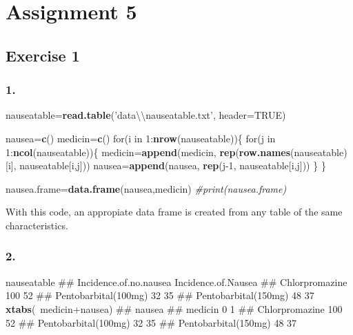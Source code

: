 \documentclass[11pt,]{article}
\newenvironment{Shaded}{\begin{snugshade}}{\end{snugshade}}
\newcommand{\KeywordTok}[1]{\textcolor[rgb]{0.13,0.29,0.53}{\textbf{{#1}}}}
\newcommand{\DataTypeTok}[1]{\textcolor[rgb]{0.13,0.29,0.53}{{#1}}}
\newcommand{\DecValTok}[1]{\textcolor[rgb]{0.00,0.00,0.81}{{#1}}}
\newcommand{\CharTok}[1]{\textcolor[rgb]{0.31,0.60,0.02}{{#1}}}
\newcommand{\StringTok}[1]{\textcolor[rgb]{0.31,0.60,0.02}{{#1}}}
\newcommand{\CommentTok}[1]{\textcolor[rgb]{0.56,0.35,0.01}{\textit{{#1}}}}
\newcommand{\OtherTok}[1]{\textcolor[rgb]{0.56,0.35,0.01}{{#1}}}
\newcommand{\NormalTok}[1]{{#1}}
\begin{document}
\section{Assignment 5}\label{assignment-5}

\subsection{Exercise 1}\label{exercise-1-1}

\subsubsection{1.}\label{section-20}

\begin{Shaded}
\begin{Highlighting}[]
\NormalTok{nauseatable=}\KeywordTok{read.table}\NormalTok{(}\StringTok{'data}\CharTok{\textbackslash{}\textbackslash{}}\StringTok{nauseatable.txt'}\NormalTok{, }\DataTypeTok{header=}\OtherTok{TRUE}\NormalTok{)}

\NormalTok{nausea=}\KeywordTok{c}\NormalTok{()}
\NormalTok{medicin=}\KeywordTok{c}\NormalTok{()}
\NormalTok{for(i in }\DecValTok{1}\NormalTok{:}\KeywordTok{nrow}\NormalTok{(nauseatable))\{}
  \NormalTok{for(j in }\DecValTok{1}\NormalTok{:}\KeywordTok{ncol}\NormalTok{(nauseatable))\{}
    \NormalTok{medicin=}\KeywordTok{append}\NormalTok{(medicin, }\KeywordTok{rep}\NormalTok{(}\KeywordTok{row.names}\NormalTok{(nauseatable)[i], nauseatable[i,j]))}
    \NormalTok{nausea=}\KeywordTok{append}\NormalTok{(nausea, }\KeywordTok{rep}\NormalTok{(j}\DecValTok{-1}\NormalTok{, nauseatable[i,j]))}
  \NormalTok{\}}
\NormalTok{\}}

\NormalTok{nausea.frame=}\KeywordTok{data.frame}\NormalTok{(nausea,medicin)}
\CommentTok{#print(nausea.frame)}
\end{Highlighting}
\end{Shaded}

With this code, an appropiate data frame is created from any table of
the same characteristics.

\subsubsection{2.}\label{section-21}

\begin{Shaded}
\begin{Highlighting}[]
\NormalTok{nauseatable}
\NormalTok{##                      Incidence.of.no.nausea Incidence.of.Nausea}
\NormalTok{## Chlorpromazine                          100                  52}
\NormalTok{## Pentobarbital(100mg)                     32                  35}
\NormalTok{## Pentobarbital(150mg)                     48                  37}
\KeywordTok{xtabs}\NormalTok{(~medicin+nausea)}
\NormalTok{##                       nausea}
\NormalTok{## medicin                  0   1}
\NormalTok{##   Chlorpromazine       100  52}
\NormalTok{##   Pentobarbital(100mg)  32  35}
\NormalTok{##   Pentobarbital(150mg)  48  37}
\end{Highlighting}
\end{Shaded}
\end{document}
